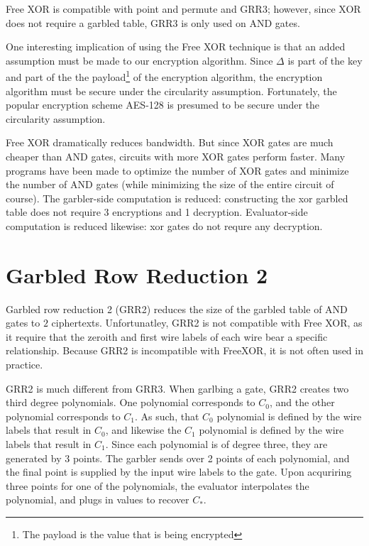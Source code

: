 Free XOR is compatible with point and permute and GRR3; however, since XOR does not require a garbled table, GRR3 is only used on AND gates.

One interesting implication of using the Free XOR technique is that an added assumption must be made to our encryption algorithm.
Since $\Delta$ is part of the key and part of the the payload\footnote{The payload is the value that is being encrypted} of the encryption algorithm, the encryption algorithm must be secure under the circularity assumption.
Fortunately, the popular encryption scheme AES-128 is presumed to be secure under the circularity assumption.

Free XOR dramatically reduces bandwidth.
But since XOR gates are much cheaper than AND gates, circuits with more XOR gates perform faster.
Many programs have been made to optimize the number of XOR gates and minimize the number of AND gates (while minimizing the size of the entire circuit of course).
The garbler-side computation is reduced: constructing the xor garbled table does not require 3 encryptions and 1 decryption.
Evaluator-side computation is reduced likewise: xor gates do not requre any decryption.

\section{Garbled Row Reduction 2}
Garbled row reduction 2 (GRR2) reduces the size of the garbled table of AND gates to $2$ ciphertexts.
Unfortunatley, GRR2 is not compatible with Free XOR, as it require that the zeroith and first wire labels of each wire bear a specific relationship.
Because GRR2 is incompatible with FreeXOR, it is not often used in practice.

GRR2 is much different from GRR3.
When garlbing a gate, GRR2 creates two third degree polynomials.
One polynomial corresponds to $C_0$, and the other polynomial corresponds to $C_1$.
As such, that $C_0$ polynomial is defined by the wire labels that result in $C_0$, and likewise the $C_1$ polynomial is defined by the wire labels that result in $C_1$.
Since each polynomial is of degree three, they are generated by $3$ points.
The garbler sends over 2 points of each polynomial, and the final point is supplied by the input wire labels to the gate.
Upon acquriring three points for one of the polynomials, the evaluator interpolates the polynomial, and plugs in values to recover $C_*$.

